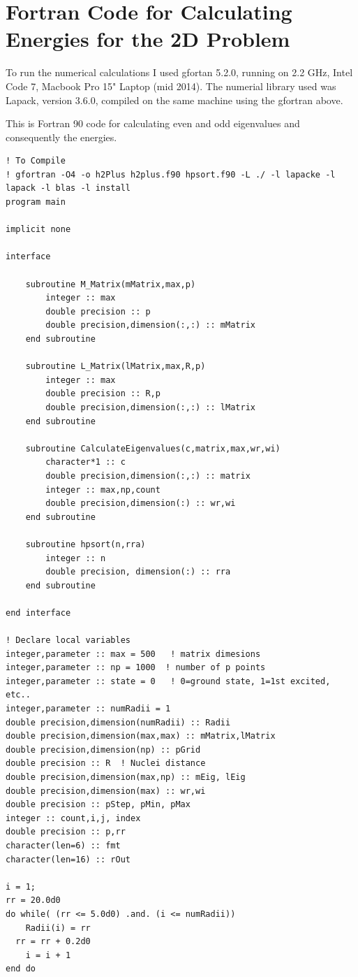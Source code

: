 \chapter{Fortran Code for Calculating Energies for the 2D Problem}
\label{AppendixD}

To run the numerical calculations I used gfortan 5.2.0, running on 2.2 GHz, Intel Code 7, Macbook Pro 15" Laptop (mid 2014). The numerial library used was Lapack, version 3.6.0, compiled on the same machine using the gfortran above.

This is Fortran 90 code for calculating even and odd eigenvalues and consequently the energies.

\begingroup
\scriptsize
\begin{verbatim}
! To Compile 
! gfortran -O4 -o h2Plus h2plus.f90 hpsort.f90 -L ./ -l lapacke -l lapack -l blas -l install
program main

implicit none

interface 

	subroutine M_Matrix(mMatrix,max,p)
		integer :: max
		double precision :: p
		double precision,dimension(:,:) :: mMatrix
	end subroutine

	subroutine L_Matrix(lMatrix,max,R,p)
		integer :: max
		double precision :: R,p
		double precision,dimension(:,:) :: lMatrix
	end subroutine

	subroutine CalculateEigenvalues(c,matrix,max,wr,wi)
		character*1 :: c
		double precision,dimension(:,:) :: matrix
		integer :: max,np,count
		double precision,dimension(:) :: wr,wi
	end subroutine 

	subroutine hpsort(n,rra)
		integer :: n
		double precision, dimension(:) :: rra
	end subroutine 

end interface

! Declare local variables
integer,parameter :: max = 500   ! matrix dimesions
integer,parameter :: np = 1000  ! number of p points 
integer,parameter :: state = 0   ! 0=ground state, 1=1st excited, etc.. 
integer,parameter :: numRadii = 1
double precision,dimension(numRadii) :: Radii
double precision,dimension(max,max) :: mMatrix,lMatrix
double precision,dimension(np) :: pGrid
double precision :: R  ! Nuclei distance
double precision,dimension(max,np) :: mEig, lEig 
double precision,dimension(max) :: wr,wi
double precision :: pStep, pMin, pMax
integer :: count,i,j, index
double precision :: p,rr
character(len=6) :: fmt
character(len=16) :: rOut

i = 1;
rr = 20.0d0
do while( (rr <= 5.0d0) .and. (i <= numRadii))
	Radii(i) = rr
  rr = rr + 0.2d0
	i = i + 1
end do


\end{verbatim}
